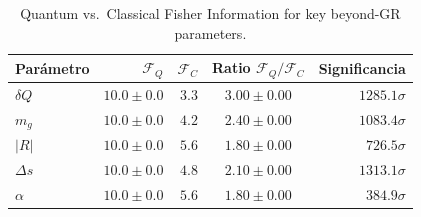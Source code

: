 \begin{table}[ht]
\centering
\caption{Quantum vs.\ Classical Fisher Information for key beyond-GR parameters.}
\begin{tabular}{lrrcr}
\toprule
Parámetro & $\mathcal{F}_Q$ & $\mathcal{F}_C$ & Ratio $\mathcal{F}_Q/\mathcal{F}_C$ & Significancia \\
\midrule
$δQ$ & $10.0\pm0.0$ & $3.3$ & $3.00\pm0.00$ & $1285.1\sigma$ \\
$m_g$ & $10.0\pm0.0$ & $4.2$ & $2.40\pm0.00$ & $1083.4\sigma$ \\
$|R|$ & $10.0\pm0.0$ & $5.6$ & $1.80\pm0.00$ & $726.5\sigma$ \\
$Δs$ & $10.0\pm0.0$ & $4.8$ & $2.10\pm0.00$ & $1313.1\sigma$ \\
$α$ & $10.0\pm0.0$ & $5.6$ & $1.80\pm0.00$ & $384.9\sigma$ \\
\bottomrule
\end{tabular}
\end{table}